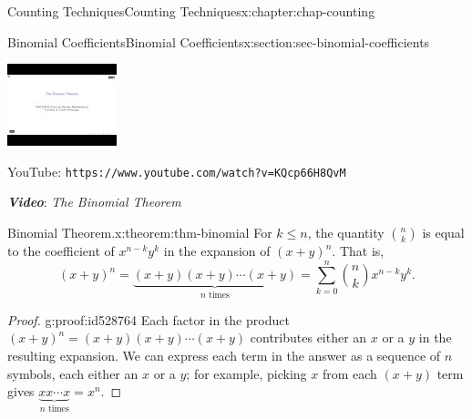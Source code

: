 \documentclass[oneside,10pt,]{book}
\newcommand{\mono}[1]{\texttt{#1}}
\newcommand{\alert}[1]{\textbf{\textit{#1}}}
\numberwithin{equation}{section}
\newlength{\qrsize}
\newlength{\previewwidth}
\begin{document}
\begin{chapterptx}{Counting Techniques}{}{Counting Techniques}{}{}{x:chapter:chap-counting}
\begin{sectionptx}{Binomial Coefficients}{}{Binomial Coefficients}{}{}{x:section:sec-binomial-coefficients}
\begin{sidebyside}{1}{0}{0}{0}
\begin{sbspanel}{1}
\begin{tcbraster}[raster columns=2, raster column skip=1pt, raster halign=center, raster force size=false, raster left skip=0pt, raster right skip=0pt]
\begin{tcolorbox}[previewstyle, width=\previewwidth]%
\includegraphics[width=0.80\linewidth,height=\qrsize,keepaspectratio]{images/video-binomial-theorem.jpg}%
\end{tcolorbox}%
\begin{tcolorbox}[qrstyle]%
{\hypersetup{urlcolor=black}}%
\end{tcolorbox}%
\begin{tcolorbox}[captionstyle]%
\small YouTube: \mono{https://www.youtube.com/watch?v=KQcp66H8QvM}\end{tcolorbox}%
\end{tcbraster}%
\end{sbspanel}%
\end{sidebyside}%
\par
\alert{Video}: \emph{The Binomial Theorem}%
\begin{theorem}{Binomial Theorem.}{}{x:theorem:thm-binomial}%
For \(k \leq n\), the quantity \(\displaystyle\binom{n}{k}\) is equal to the coefficient of \(x^{n-k}y^k\) in the expansion of \((x+y)^n\). That is,%
\begin{equation*}
(x+y)^n = \underbrace{(x+y)(x+y)\cdots(x+y)}_\text{$n$ times} = \displaystyle\sum_{k=0}^n \binom{n}{k}x^{n-k}y^k\text{.}
\end{equation*}
%
\end{theorem}
\begin{proof}{}{g:proof:id528764}
Each factor in the product \((x+y)^n = (x+y)(x+y)\cdots(x+y)\) contributes either an \(x\) or a \(y\) in the resulting expansion. We can express each term in the answer as a sequence of \(n\) symbols, each either an \(x\) or a \(y\); for example, picking \(x\) from each \((x+y)\) term gives \(\underbrace{xx\cdots x}_\text{$n$ times}=x^n\).%

\end{proof}
\end{sectionptx}
\end{chapterptx}
\end{document}
